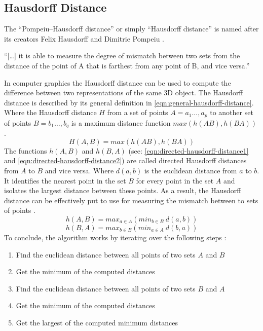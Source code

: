 \subsection{Hausdorff Distance}
The ``Pompeiu–Hausdorff distance'' or simply ``Hausdorff distance'' is named after its creators Felix Hausdorff and Dimitrie Pompeiu \cite{birsanOneHundredYears2006}.
\begin{displayquote}
	``[\ldots] it is able to measure the degree of mismatch between two sets from the distance of the point of A that is farthest from any point of B, and vice versa.''
\end{displayquote}
In computer graphics the Hausdorff distance can be used to compute the difference between two representations of the same 3D object.
The Hausdorff distance is described by its general definition in \cref{eqn:general-hausdorff-distance}.
Where the Hausdorff distance $H$ from a set of points $A={a_{1}\ldots,a_{p}}$ to another set of points $B={b_{1}\ldots,b_{q}}$ is a maximum distance function $max(h(AB),h(BA))$ \cite{hausdorffGrundzuegeMengenlehre1978,simBrainVentricleDetection2016,gegoireHausdorffDistanceConvex1998}.
\begin{equation}\label{eqn:general-hausdorff-distance}
	H(A,B)=max(h(AB),h(BA))
\end{equation}
The functions $h(A,B)$ and $h(B,A)$ (see: \cref{eqn:directed-hausdorff-distance1} and \cref{eqn:directed-hausdorff-distance2}) are called directed Hausdorff distances from $A$ to $B$ and vice versa.
Where $d(a,b)$ is the euclidean distance from $a$ to $b$.
It identifies the nearest point in the set $B$ for every point in the set $A$ and isolates the largest distance between these points.
As a result, the Hausdorff distance can be effectively put to use for measuring the mismatch between to sets of points \cite{hausdorffGrundzuegeMengenlehre1978,simBrainVentricleDetection2016,gegoireHausdorffDistanceConvex1998}.
\begin{equation}\label{eqn:directed-hausdorff-distance1}
	h(A,B)=max_{a \in A}(min_{b \in B}\ d(a,b))
\end{equation}
\begin{equation}\label{eqn:directed-hausdorff-distance2}
	h(B,A)=max_{b \in B}(min_{a \in A}\ d(b,a))
\end{equation}
To conclude, the algorithm works by iterating over the following steps \cite{hausdorffGrundzuegeMengenlehre1978,simBrainVentricleDetection2016,gegoireHausdorffDistanceConvex1998}:
\begin{enumerate}
	\item Find the euclidean distance between all points of two sets $A$ and $B$
	\item Get the minimum of the computed distances
	\item Find the euclidean distance between all points of two sets $B$ and $A$
	\item Get the minimum of the computed distances
	\item Get the largest of the computed minimum distances
\end{enumerate}


